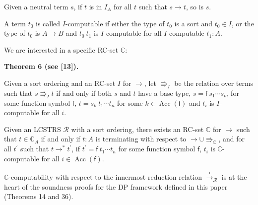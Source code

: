 \documentclass[10pt,a4paper]{amsart}
\begin{document}
Given a neutral term $s$, if $t$ is in $I_{A}$ for all $t$ such that $s\rightarrow t$, so is $s$.\par
 
 
  
A term $t_{0}$ is called $I$-computable if either the type of $t_{0}$ is a sort and $t_{0}\in I$, or the type of $t_{0}$ is $A\rightarrow B$ and ${t_{0}}\ {t_{1}}$ is $I$-computable for all $I$-computable $t_{1}:A$.\par
 
 
 
We are interested in a specific RC-set $\mathbb{C}$:\par
 
 
 
\par\medskip\noindent\textbf{Theorem 6 (see [13]).}\par
 
 
Given a sort ordering and an RC-set $I$ for $\rightarrow$, let $\Rrightarrow_{I}$ be the relation over terms such that $s\Rrightarrow_{I}t$ if and only if both $s$ and $t$ have a base type, $s={\mathsf{f}}\ {{s}_{1}\cdots{s}_{m}}$ for some function symbol $\mathsf{f}$, $t={s_{k}}\ {{t}_{1}\cdots{t}_{n}}$ for some $k\in\operatorname{Acc}(\mathsf{f})$ and $t_{i}$ is $I$-computable for all $i$.\par
 
 
 
Given an LCSTRS $\mathcal{R}$ with a sort ordering, there exists an RC-set $\mathbb{C}$ for $\rightarrow$ such that $t\in\mathbb{C}_{A}$ if and only if $t:A$ is terminating with respect to ${\rightarrow}\cup{\Rrightarrow_{\mathbb{C}}}$, and for all $t^{\prime}$ such that $t\rightarrow^{*}t^{\prime}$, if $t^{\prime}={\mathsf{f}}\ {{t}_{1}\cdots{t}_{n}}$ for some function symbol $\mathsf{f}$, $t_{i}$ is $\mathbb{C}$-computable for all $i\in\operatorname{Acc}(\mathsf{f})$.\par
 
 
 
 
$\mathbb{C}$-computability with respect to the innermost reduction relation $\xrightarrow{\scriptscriptstyle\mathrm{i}}_{\mathcal{R}}$ is at the heart of the soundness proofs for the DP framework defined in this paper (Theorems 14 and 36).\par
 
\end{document}
